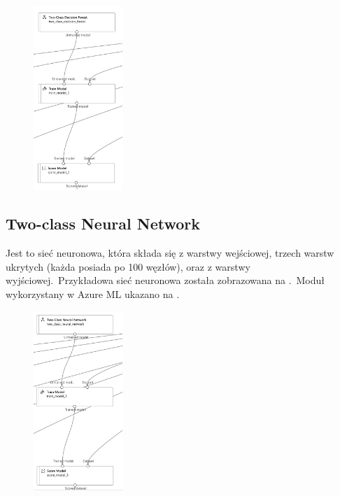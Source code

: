 \begin{figure}[H]
    \centering
    \includegraphics[width=0.3\textwidth]{images/df_pipe}
    \label{fig:df-pipe}
\end{figure}

\vfill
\pagebreak

\subsection{Two-class Neural Network}
Jest to sieć neuronowa, która składa się z warstwy wejściowej, trzech warstw ukrytych (każda posiada po 100 węzłów), oraz z warstwy wyjściowej.\ Przykładowa sieć neuronowa została zobrazowana na .\ Moduł wykorzystany w Azure ML ukazano na .

\begin{figure}[H]
    \centering
    \includegraphics[width=0.3\textwidth]{images/nn_pipe}
    \label{fig:nn-pipe}
\end{figure}


